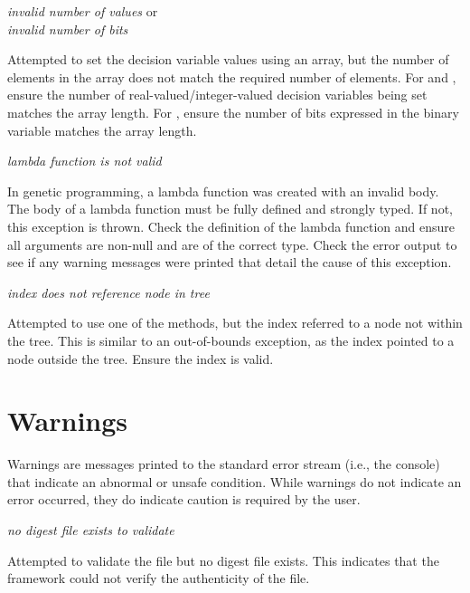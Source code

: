 \noindent
\textit{invalid number of values} or\\
\textit{invalid number of bits}
\begin{indented}
  Attempted to set the decision variable values using an array, but the number of elements in the array does not match the required number of elements. For  and , ensure the number of real-valued/integer-valued decision variables being set matches the array length.  For , ensure the number of bits expressed in the binary variable matches the array length.
\end{indented}

\noindent
\textit{lambda function is not valid}
\begin{indented}
  In genetic programming, a lambda function was created with an invalid body. The body of a lambda function must be fully defined and strongly typed.  If not, this exception is thrown.  Check the definition of the lambda function and ensure all arguments are non-null and are of the correct type.  Check the error output to see if any warning messages were printed that detail the cause of this exception.
\end{indented}

\noindent
\textit{index does not reference node in tree}
\begin{indented}
  Attempted to use one of the  methods, but the index referred to a node not within the tree.  This is similar to an out-of-bounds exception, as the index pointed to a node outside the tree.  Ensure the index is valid.
\end{indented}


\section{Warnings}
Warnings are messages printed to the standard error stream (i.e., the console) that indicate an abnormal or unsafe condition.  While warnings do not indicate an error occurred, they do indicate caution is required by the user.
\vspace{\baselineskip}

\noindent
\textit{no digest file exists to validate }
\begin{indented}
  Attempted to validate the file but no digest file exists.  This indicates that the framework could not verify the authenticity of the file.
\end{indented}
  
